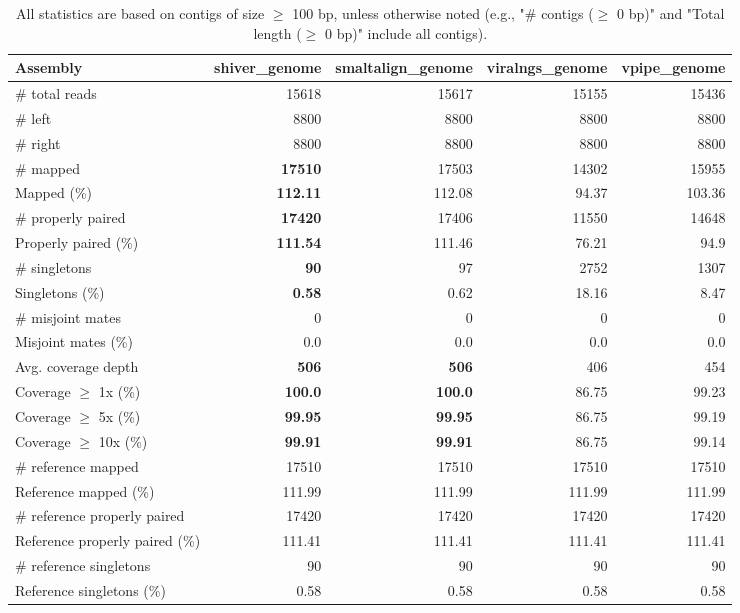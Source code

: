 \documentclass[12pt,a4paper]{article}
\begin{document}
\begin{table}[ht]
\begin{center}
\caption{All statistics are based on contigs of size $\geq$ 100 bp, unless otherwise noted (e.g., "\# contigs ($\geq$ 0 bp)" and "Total length ($\geq$ 0 bp)" include all contigs).}
\begin{tabular}{|l*{4}{|r}|}
\hline
Assembly & shiver\_genome & smaltalign\_genome & viralngs\_genome & vpipe\_genome \\ \hline
\# total reads & 15618 & 15617 & 15155 & 15436 \\ \hline
\# left & 8800 & 8800 & 8800 & 8800 \\ \hline
\# right & 8800 & 8800 & 8800 & 8800 \\ \hline
\# mapped & {\bf 17510} & 17503 & 14302 & 15955 \\ \hline
Mapped (\%) & {\bf 112.11} & 112.08 & 94.37 & 103.36 \\ \hline
\# properly paired & {\bf 17420} & 17406 & 11550 & 14648 \\ \hline
Properly paired (\%) & {\bf 111.54} & 111.46 & 76.21 & 94.9 \\ \hline
\# singletons & {\bf 90} & 97 & 2752 & 1307 \\ \hline
Singletons (\%) & {\bf 0.58} & 0.62 & 18.16 & 8.47 \\ \hline
\# misjoint mates & 0 & 0 & 0 & 0 \\ \hline
Misjoint mates (\%) & 0.0 & 0.0 & 0.0 & 0.0 \\ \hline
Avg. coverage depth & {\bf 506} & {\bf 506} & 406 & 454 \\ \hline
Coverage $\geq$ 1x (\%) & {\bf 100.0} & {\bf 100.0} & 86.75 & 99.23 \\ \hline
Coverage $\geq$ 5x (\%) & {\bf 99.95} & {\bf 99.95} & 86.75 & 99.19 \\ \hline
Coverage $\geq$ 10x (\%) & {\bf 99.91} & {\bf 99.91} & 86.75 & 99.14 \\ \hline
\# reference mapped & 17510 & 17510 & 17510 & 17510 \\ \hline
Reference mapped (\%) & 111.99 & 111.99 & 111.99 & 111.99 \\ \hline
\# reference properly paired & 17420 & 17420 & 17420 & 17420 \\ \hline
Reference properly paired (\%) & 111.41 & 111.41 & 111.41 & 111.41 \\ \hline
\# reference singletons & 90 & 90 & 90 & 90 \\ \hline
Reference singletons (\%) & 0.58 & 0.58 & 0.58 & 0.58 \\ \hline

\end{tabular}
\end{center}
\end{table}
\end{document}
